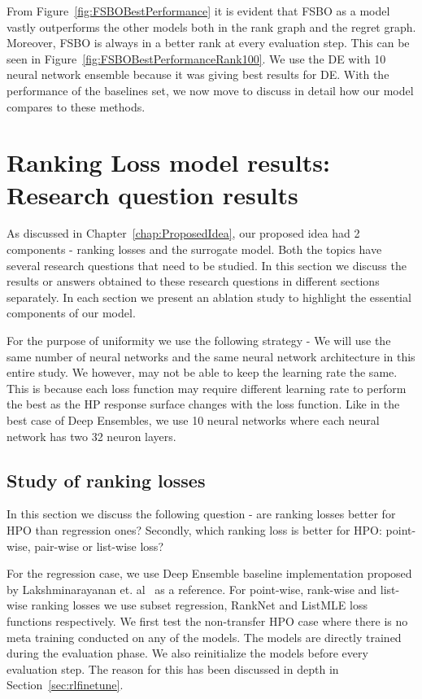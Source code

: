 \documentclass[12pt, twoside, ngerman]{report}
\begin{document}
From Figure~\ref{fig:FSBOBestPerformance} it is evident that FSBO as a model vastly outperforms the other models both in the rank graph and the regret graph.
Moreover,  FSBO is always in a better rank at every evaluation step.
This can be seen in Figure~\ref{fig:FSBOBestPerformanceRank100}.
We use the DE with 10 neural network ensemble because it was giving best results for DE.
With the performance of the baselines set,  we now move to discuss in detail how our model compares to these methods.


\section{Ranking Loss model results: Research question results}

As discussed in Chapter~\ref{chap:ProposedIdea},  our
proposed idea had 2 components - ranking losses and the surrogate model.
Both the topics have several research questions that need to be studied.
In this section we discuss the results or answers obtained to these research questions in different sections separately.
In each section we present an ablation study to highlight the essential components of our model.

For the purpose of uniformity we use the following strategy - We will use the same number of neural networks and the same neural network architecture in this entire study.
We however,  may not be able to keep the learning rate the same. 
This is because each loss function may require different learning rate to perform the best as the HP response surface changes with the loss function.
Like in the best case of Deep Ensembles,  we use 10 neural networks where each neural network has two 32 neuron layers.

\subsection{Study of ranking losses}

In this section we discuss the following question - are ranking losses better for HPO than regression ones?
Secondly,  which ranking loss is better for HPO: point-wise,  pair-wise or list-wise loss?

For the regression case,  we use Deep Ensemble baseline implementation proposed by Lakshminarayanan et. al~\cite{DeepEnsemblePaper} as a reference. 
For point-wise,  rank-wise and list-wise ranking losses we use subset regression,  RankNet and ListMLE loss functions respectively.
We first test the non-transfer HPO case where there is no meta training conducted on any of the models.
The models are directly trained during the evaluation phase.
We also reinitialize the models before every evaluation step.
The reason for this has been discussed in depth in Section~\ref{sec:rlfinetune}.
\end{document}
